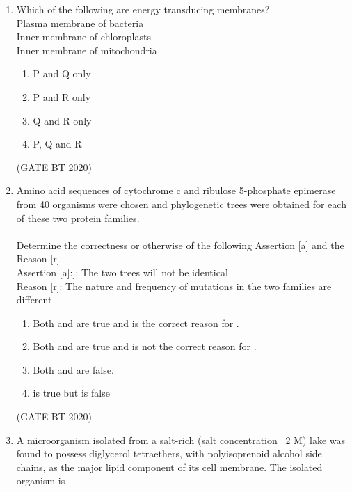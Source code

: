 \documentclass[journal,12pt,onecolumn]{IEEEtran}
\theoremstyle{remark}
\begin{document}
\begin{enumerate}[label=Q\arabic*:]
\item Which of the following are energy transducing membranes?\\
 Plasma membrane of bacteria\\
 Inner membrane of chloroplasts\\
 Inner membrane of mitochondria
\begin{multicols}{2}
\begin{enumerate}

\item\;P and Q only
\item\;P and R only
\item\;Q and R only
\item\;P, Q and R

\end{enumerate}
\end{multicols}
\hfill(GATE BT 2020)

\item Amino acid sequences of cytochrome c and ribulose 5-phosphate epimerase from 40 organisms were chosen and phylogenetic trees were obtained for each of these two protein families.\\
\\Determine the correctness or otherwise of the following Assertion [a] and the Reason [r].\\Assertion [a]:]: The two trees will not be identical\\
Reason [r]: The nature and frequency of mutations in the two families are
different
\begin{multicols}{2}
\begin{enumerate}

\item\;Both   and   are true and   is the correct reason for .
\item\;Both   and   are true and  is not the correct reason for  .
\item\;Both    and   are false.
\item\;  is true but   is  false

\end{enumerate} 
\end{multicols}
\hfill(GATE BT 2020)

\item A microorganism isolated from a salt-rich (salt concentration ~2 M) lake was
found to possess diglycerol tetraethers, with polyisoprenoid alcohol side chains, as the major lipid component of its cell membrane. The isolated organism is
\begin{multicols}{2}
\begin{enumerate}


\end{enumerate}
\end{multicols}
\end{enumerate}
\end{document}
